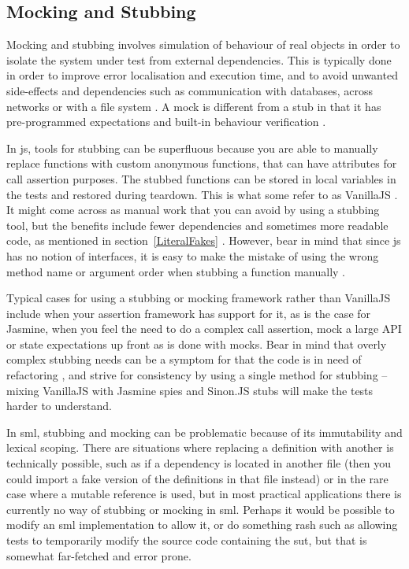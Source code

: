 \documentclass[11pt]{article}
\begin{document}
\subsection{Mocking and Stubbing}
\label{subsec:mocking}

Mocking and stubbing involves simulation of behaviour of real objects in order to isolate the system under test from external dependencies. This is typically done in order to improve error localisation and execution time, and to avoid unwanted side-effects and dependencies such as communication with databases, across networks or with a file system \cite[ch.~2]{Legacy}. A mock is different from a stub in that it has pre-programmed expectations and built-in behaviour verification \cite[p.~453]{Tddjs}.

In \gls{js}, tools for stubbing can be superfluous because you are able to manually replace functions with custom anonymous functions, that can have attributes for call assertion purposes. The stubbed functions can be stored in local variables in the tests and restored during teardown. This is what some refer to as VanillaJS \cite[question~53]{Edelstam}. It might come across as manual work that you can avoid by using a stubbing tool, but the benefits include fewer dependencies and sometimes more readable code, as mentioned in section~\ref{LiteralFakes} \cite[questions~54-55]{Edelstam}. However, bear in mind that since \gls{js} has no notion of interfaces, it is easy to make the mistake of using the wrong method name or argument order when stubbing a function manually \cite[p.~471]{Tddjs}.

Typical cases for using a stubbing or mocking framework rather than VanillaJS include when your assertion framework has support for it, as is the case for Jasmine, when you feel the need to do a complex call assertion, mock a large API or state expectations up front as is done with mocks. Bear in mind that overly complex stubbing needs can be a symptom for that the code is in need of refactoring \cite[question~34]{Stenmark}, and strive for consistency by using a single method for stubbing -- mixing VanillaJS with Jasmine spies and Sinon.JS stubs will make the tests harder to understand.

In \gls{sml}, stubbing and mocking can be problematic because of its immutability and lexical scoping. There are situations where replacing a definition with another is technically possible, such as if a dependency is located in another file (then you could import a fake version of the definitions in that file instead) or in the rare case where a mutable reference is used, but in most practical applications there is currently no way of stubbing or mocking in \gls{sml}. Perhaps it would be possible to modify an \gls{sml} implementation to allow it, or do something rash such as allowing tests to temporarily modify the source code containing the \gls{sut}, but that is somewhat far-fetched and error prone.
\end{document}
